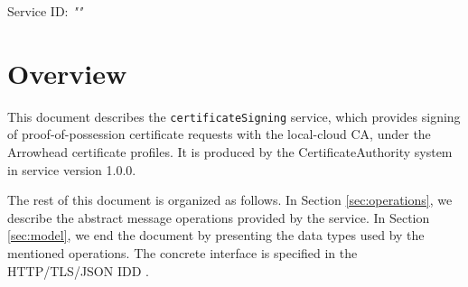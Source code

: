 \documentclass[a4paper]{arrowhead}
\begin{document}
\sloppy

\ArrowheadSetup

\begin{center}
  \vspace*{1cm}
  \huge{\arrowtitle}

  \vspace*{0.2cm}
  \LARGE{\arrowtype}
  \vspace*{1cm}

  \Large{Service ID: \textit{"\arrowid"}}

  \vspace*{\fill}


  \vspace*{1cm}
  \vspace*{\fill}

  \begin{abstract}
    This document describes the \texttt{certificateSigning} service, version 1.0.0, produced by the CertificateAuthority support system of Arrowhead 5.2.2.
  \end{abstract}

  \vspace*{1cm}
\end{center}

\newpage

\tableofcontents
\newpage

\section{Overview}
\label{sec:overview}

This document describes the \texttt{certificateSigning} service, which provides signing of proof-of-possession certificate requests with the local-cloud CA, under the Arrowhead certificate profiles.
It is produced by the CertificateAuthority system \cite{cau-sysd} in service version 1.0.0.

The rest of this document is organized as follows.
In Section \ref{sec:operations}, we describe the abstract message operations provided by the service.
In Section \ref{sec:model}, we end the document by presenting the data types used by the mentioned operations.
The concrete interface is specified in the HTTP/TLS/JSON IDD \cite{cau-certificateSigning-http-idd}.
\end{document}
